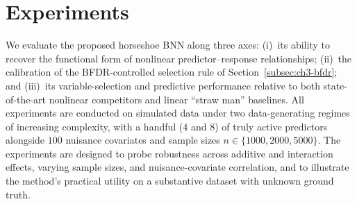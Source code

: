 


\section{Experiments}
\label{sec:ch3-experiments}

We evaluate the proposed horseshoe BNN along three axes: 
(i)~its ability to recover the functional form of nonlinear predictor--response relationships; 
(ii)~the calibration of the BFDR-controlled selection rule of Section~\ref{subsec:ch3-bfdr};
and (iii)~its variable-selection and predictive performance relative
to both state-of-the-art nonlinear competitors and linear ``straw
man'' baselines.  All experiments are conducted on simulated data
under two data-generating regimes of increasing complexity, with
a handful ($4$ and $8$) of truly active predictors alongside $100$
nuisance covariates and sample sizes $n \in \{1000, 2000, 5000\}$.  
The experiments are
designed to probe robustness across additive and interaction effects,
varying sample sizes, and nuisance-covariate
correlation, and to illustrate the method's practical utility on a
substantive dataset with unknown ground truth.

